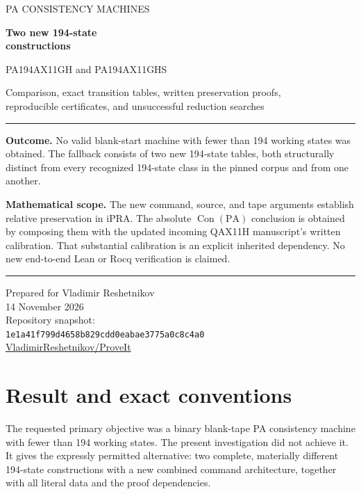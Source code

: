 \documentclass[10pt,letterpaper]{article}
\newcommand{\PA}{\mathrm{PA}}
\newcommand{\Con}{\operatorname{Con}}
\begin{document}
\begin{titlepage}
\vspace*{0.4in}
{\color{ink}\sffamily\large PA CONSISTENCY MACHINES\par}
\vspace{0.3in}
{\color{ink}\sffamily\bfseries\Huge Two new 194-state\\[6pt] constructions\par}
\vspace{0.18in}
{\sffamily\LARGE PA194AX11GH and PA194AX11GHS\par}
\vspace{0.35in}
{\large Comparison, exact transition tables, written preservation proofs,\\
reproducible certificates, and unsuccessful reduction searches\par}
\vspace{0.4in}
\hrule\vspace{0.14in}
\textbf{Outcome.} No valid blank-start machine with fewer than 194 working
states was obtained. The fallback consists of two new 194-state tables,
both structurally distinct from every recognized 194-state class in the
pinned corpus and from one another.

\textbf{Mathematical scope.} The new command, source, and tape arguments
establish relative preservation in iPRA. The absolute
$\Con(\PA)$ conclusion is obtained by composing them with the updated
incoming QAX11H manuscript's written calibration. That substantial
calibration is an explicit inherited dependency. No new end-to-end Lean
or Rocq verification is claimed.
\vspace{0.14in}\hrule
\vfill
Prepared for Vladimir Reshetnikov\\
14 November 2026\\[8pt]
Repository snapshot:\\
\nolinkurl{1e1a41f799d4658b829cdd0eabae3775a0c8c4a0}\\[6pt]
\href{https://github.com/VladimirReshetnikov/ProveIt/tree/1e1a41f799d4658b829cdd0eabae3775a0c8c4a0}{VladimirReshetnikov/ProveIt}
\end{titlepage}
\tableofcontents\newpage

\section{Result and exact conventions}

The requested primary objective was a binary blank-tape PA consistency
machine with fewer than 194 working states. The present investigation did
not achieve it. It gives the expressly permitted alternative: two complete,
materially different 194-state constructions with a new combined command
architecture, together with all literal data and the proof dependencies.
\end{document}
